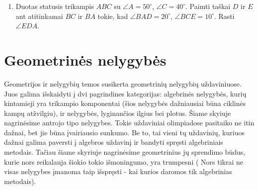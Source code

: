 \begin{enumerate}
%   
 \item Duotas statusis trikampis $ABC$ su $\angle A=50^\circ$, $\angle 
 C=40^\circ$. Paimti taškai $D$ ir $E$ ant atitinkamai $BC$ ir $BA$ tokie, 
 kad $\angle BAD=20^\circ$, $\angle BCE=10^\circ$. Rasti $\angle EDA$.
\end{enumerate}

\newpage
\section{Geometrinės nelygybės}



Geometrijos ir nelygybių temos susikerta geometrinių nelygybių
uždaviniuose. Juos galima išskaidyti į dvi pagrindines kategorijas:
algebrinės nelygybės, kurių kintamieji yra trikampio komponentai (šios
nelygybės dažniausiai būna ciklinės kampų atžvilgiu), ir nelygybės,
lyginančios ilgius bei plotus. Šiame skyiuje nagrinėsime antrojo 
tipo nelygybes. Tokie uždaviniai olimpiadose pasitaiko ne itin dažnai, bet jie būna
įvairiausio sunkumo. Be to, tai vieni tų uždavinių, kuriuos
dažnai galima paversti į algebros uždavinį ir bandyti spręsti 
algebriniais metodais. Tačiau šiame skyriuje nagrinėsime geometrinius
 jų sprendimo būdus, kurie nors reikalauja šiokio tokio išmoningumo,
yra trumpesni ( Nors tikrai ne visas nelygybes įmanoma 
taip išspręsti - kai kurios daromos tik algebrinias metodais).

